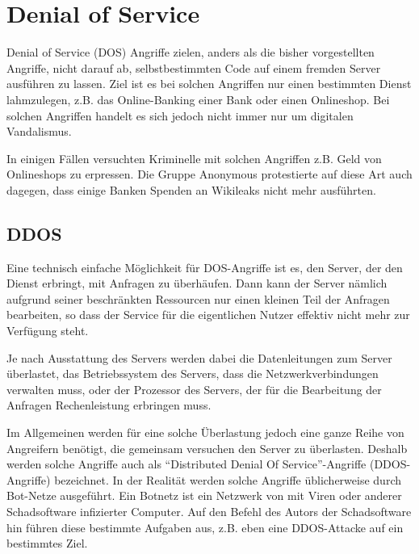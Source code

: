 \section{Denial of Service}
 
Denial of Service (DOS) Angriffe zielen, anders als die bisher vorgestellten Angriffe, nicht darauf ab, selbstbestimmten Code auf einem fremden Server ausführen zu lassen.
Ziel ist es bei solchen Angriffen nur einen bestimmten Dienst lahmzulegen, z.B. das Online-Banking einer Bank oder einen Onlineshop.
Bei solchen Angriffen handelt es sich jedoch nicht immer nur um digitalen Vandalismus.

In einigen Fällen versuchten Kriminelle mit solchen Angriffen z.B. Geld von Onlineshops zu erpressen.
Die Gruppe Anonymous protestierte auf diese Art auch dagegen, dass einige Banken Spenden an Wikileaks nicht mehr ausführten.\\

\subsection{DDOS}
 
Eine technisch einfache Möglichkeit für DOS-Angriffe ist es, den Server, der den Dienst erbringt, mit Anfragen zu überhäufen. Dann kann der Server nämlich aufgrund seiner beschränkten Ressourcen nur einen kleinen Teil der Anfragen bearbeiten, so dass der Service für die eigentlichen Nutzer effektiv nicht mehr zur Verfügung steht.

Je nach Ausstattung des Servers werden dabei die Datenleitungen zum Server überlastet, das Betriebssystem des Servers, dass die Netzwerkverbindungen verwalten muss, oder der Prozessor des Servers, der für die Bearbeitung der Anfragen Rechenleistung erbringen muss.

Im Allgemeinen werden für eine solche Überlastung jedoch eine ganze Reihe von Angreifern benötigt, die gemeinsam versuchen den Server zu überlasten.
Deshalb werden solche Angriffe auch als "`Distributed Denial Of Service"'-Angriffe (DDOS-Angriffe) bezeichnet.
In der Realität werden solche Angriffe üblicherweise durch Bot-Netze ausgeführt.
Ein Botnetz ist ein Netzwerk von mit Viren oder anderer Schadsoftware infizierter Computer.
Auf den Befehl des Autors der Schadsoftware hin führen diese bestimmte Aufgaben aus, z.B. eben eine DDOS-Attacke auf ein bestimmtes Ziel.\\

